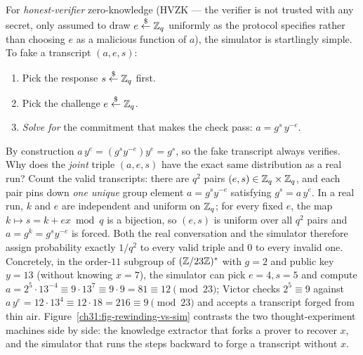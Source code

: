 For \emph{honest-verifier} zero-knowledge (HVZK --- the verifier is not trusted
with any secret, only assumed to draw $e \stackrel{\$}{\gets} \mathbb{Z}_q$ uniformly as the protocol
specifies rather than choosing $e$ as a malicious function of $a$), the
simulator is startlingly simple. To fake a transcript $(a,e,s)$:

\begin{enumerate}
  \item Pick the response $s \stackrel{\$}{\gets} \mathbb{Z}_q$ first.
  \item Pick the challenge $e \stackrel{\$}{\gets} \mathbb{Z}_q$.
  \item \emph{Solve for} the commitment that makes the check pass:
        $a = g^{s}\, y^{-e}$.
\end{enumerate}

By construction $a\,y^{e} = (g^{s} y^{-e}) y^{e} = g^{s}$, so the fake transcript
always verifies. Why does the \emph{joint} triple $(a,e,s)$ have the exact same
distribution as a real run? Count the valid transcripts: there are $q^2$ pairs
$(e,s) \in \mathbb{Z}_q \times \mathbb{Z}_q$, and each pair pins down \emph{one unique} group
element $a = g^s y^{-e}$ satisfying $g^s = a\,y^e$. In a real run, $k$ and $e$
are independent and uniform on $\mathbb{Z}_q$; for every fixed $e$, the map $k \mapsto
s = k + ex \bmod q$ is a bijection, so $(e,s)$ is uniform over all $q^2$ pairs
and $a = g^k = g^s y^{-e}$ is forced. Both the real conversation and the
simulator therefore assign probability exactly $1/q^2$ to every valid triple and
$0$ to every invalid one. Concretely, in the order-$11$ subgroup of $(\mathbb{Z}/23\mathbb{Z})^{*}$
with $g = 2$ and public key $y = 13$ (without knowing $x = 7$), the simulator can
pick $e = 4, s = 5$ and compute $a = 2^5 \cdot 13^{-4} \equiv 9 \cdot 13^7 \equiv
9 \cdot 9 = 81 \equiv 12 \pmod{23}$; Victor checks $2^5 \equiv 9$ against
$a\,y^e = 12 \cdot 13^4 \equiv 12 \cdot 18 = 216 \equiv 9 \pmod{23}$ and accepts a transcript forged
from thin air. Figure~\ref{ch31:fig-rewinding-vs-sim} contrasts the two thought-experiment machines side by side: the knowledge extractor that forks a prover to recover $x$, and the simulator that runs the steps backward to forge a transcript without $x$.

